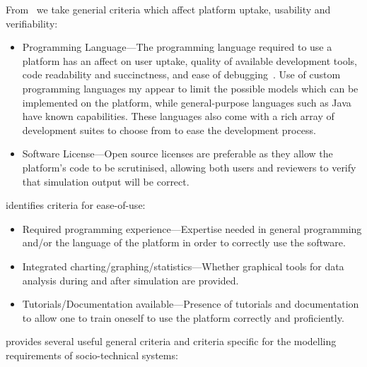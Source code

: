 From~\citet{CynthiaNikolaiandGregoryMadey2009} we take generial criteria which affect platform uptake, usability and verifiability:

\begin{itemize}
\item Programming Language---The programming language required to use a platform has an affect on user uptake, quality of available development tools, code readability and succinctness, and ease of debugging~\citep{Railsback2006}. Use of custom programming languages my appear to limit the possible models which can be implemented on the platform, while general-purpose languages such as Java have known capabilities. These languages also come with a rich array of development suites to choose from to ease the development process.
\item Software License---Open source licenses are preferable as they allow the platform's code to be scrutinised, allowing both users and reviewers to verify that simulation output will be correct.
\end{itemize}

\citet{Castle2006} identifies criteria for ease-of-use:

\begin{itemize}
\item Required programming experience---Expertise needed in general programming and/or the language of the platform in order to correctly use the software.
\item Integrated charting/graphing/statistics---Whether graphical tools for data analysis during and after simulation are provided.
\item Tutorials/Documentation available---Presence of tutorials and documentation to allow one to train oneself to use the platform correctly and proficiently.
\end{itemize}

\citet{Tobias2004} provides several useful general criteria and criteria specific for the modelling requirements of socio-technical systems:

